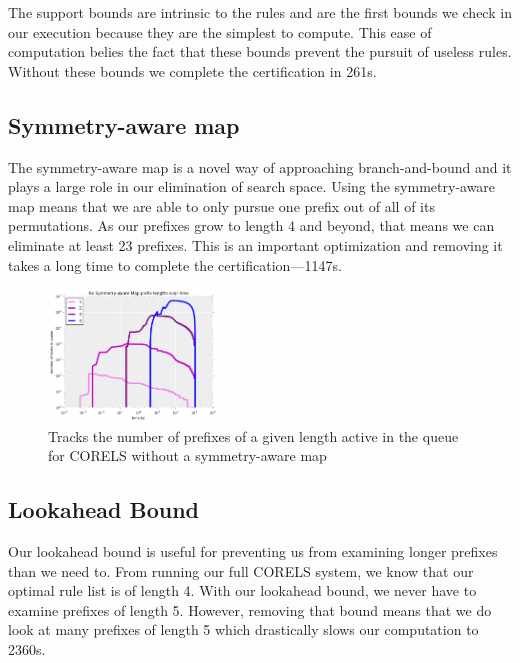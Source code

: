 The support bounds are intrinsic to the rules and are the first bounds we check in our execution because they are the simplest to compute.
This ease of computation belies the fact that these bounds prevent the pursuit of useless rules.
Without these bounds we complete the certification in 261s.

\subsection{Symmetry-aware map}

The symmetry-aware map is a novel way of approaching branch-and-bound and it plays a large role in our elimination of search space.
Using the symmetry-aware map means that we are able to only pursue one prefix out of all of its permutations.
As our prefixes grow to length 4 and beyond, that means we can eliminate at least 23 prefixes.
This is an important optimization and removing it takes a long time to complete the certification---1147s.

\begin{figure}[t!]
\begin{center}
\includegraphics[width=0.4\textwidth]{figs/pmap_prefixes.png}
\end{center}
\caption{Tracks the number of prefixes of a given length active in the queue for CORELS without a symmetry-aware map}
\label{fig:pmap-prefixes}
\end{figure}

\subsection{Lookahead Bound}

Our lookahead bound is useful for preventing us from examining longer prefixes than we need to.
From running our full CORELS system, we know that our optimal rule list is of length 4.
With our lookahead bound, we never have to examine prefixes of length 5.
However, removing that bound means that we do look at many prefixes of length 5 which drastically slows our computation to 2360s.

